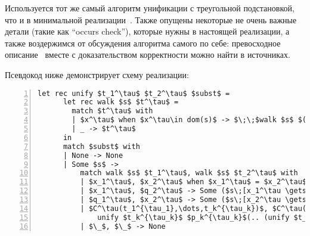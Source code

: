
Используется тот же самый алгоритм унификации с треугольной подстановкой, что и в минимальной реализации~\cite{MicroKanren}.
Также опущены некоторые не очень важные детали (такие как \enquote{occurs check}), которые нужны в настоящей реализации, а также воздержимся от обсуждения алгоритма самого по себе: превосходное описание~\cite{Kumar} вместе с доказательством корректности можно найти в источниках.


Псевдокод ниже демонстрирует схему реализации:

\begin{lstlisting}[mathescape=true,numbers=left,numberstyle=\small,stepnumber=1,numbersep=-5pt]
    let rec unify $t_1^\tau$ $t_2^\tau$ $subst$ =
      let rec walk $s$ $t^\tau$ =
        match $t^\tau$ with
        | $x^\tau$ when $x^\tau\in dom(s)$ -> $\;\;$walk $s$ $(s\;\;x^\tau)$
        | _ -> $t^\tau$
      in
      match $subst$ with
      | None -> None
      | Some $s$ ->
          match walk $s$ $t_1^\tau$, walk $s$ $t_2^\tau$ with
          | $x_1^\tau$, $x_2^\tau$ when $x_1^\tau$ = $x_2^\tau$ -> $subst$
          | $x_1^\tau$, $q_2^\tau$ -> Some ($s\;[x_1^\tau \gets q_2^\tau]$)
          | $q_1^\tau$, $x_2^\tau$ -> Some ($s\;[x_2^\tau \gets q_1^\tau]$)
          | $C^\tau(t_1^{\tau_1},\dots,t_k^{\tau_k})$, $C^\tau(p_1^{\tau_1},\dots,p_k^{\tau_k})$ ->
              unify $t_k^{\tau_k}$ $p_k^{\tau_k}$(.. (unify $t_1^{\tau_1}$ $p_1^{\tau_1}$ $subst$)$..$)
          | $\_$, $\_$ -> None
\end{lstlisting}

